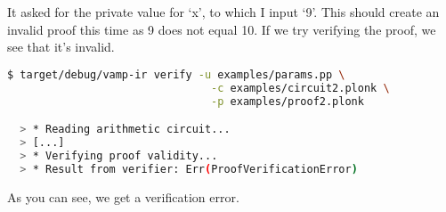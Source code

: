 It asked for the private value for `x', to which I input `9'. This should create an invalid proof this time as 9 does not equal 10. If we try verifying the proof, we see that it's invalid.

\begin{lstlisting}[language=bash]
  $ target/debug/vamp-ir verify -u examples/params.pp \
                                -c examples/circuit2.plonk \
                                -p examples/proof2.plonk

  > * Reading arithmetic circuit...
  > [...]
  > * Verifying proof validity...
  > * Result from verifier: Err(ProofVerificationError)
\end{lstlisting}

As you can see, we get a verification error.